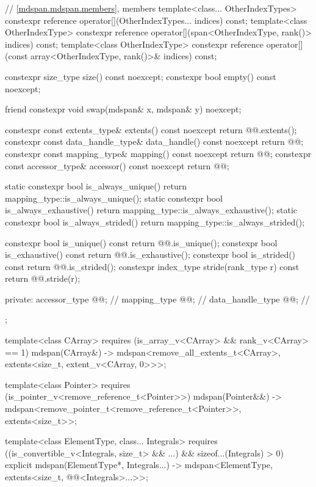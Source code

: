 \begin{codeblock}
{{    // \ref{mdspan.mdspan.members}, members
    template<class... OtherIndexTypes>
      constexpr reference operator[](OtherIndexTypes... indices) const;
    template<class OtherIndexType>
      constexpr reference operator[](span<OtherIndexType, rank()> indices) const;
    template<class OtherIndexType>
      constexpr reference operator[](const array<OtherIndexType, rank()>& indices) const;

    constexpr size_type size() const noexcept;
    constexpr bool empty() const noexcept;

    friend constexpr void swap(mdspan& x, mdspan& y) noexcept;

    constexpr const extents_type& extents() const noexcept { return @@.extents(); }
    constexpr const data_handle_type& data_handle() const noexcept { return @@; }
    constexpr const mapping_type& mapping() const noexcept { return @@; }
    constexpr const accessor_type& accessor() const noexcept { return @@; }

    static constexpr bool is_always_unique()
      { return mapping_type::is_always_unique(); }
    static constexpr bool is_always_exhaustive()
      { return mapping_type::is_always_exhaustive(); }
    static constexpr bool is_always_strided()
      { return mapping_type::is_always_strided(); }

    constexpr bool is_unique() const
      { return @@.is_unique(); }
    constexpr bool is_exhaustive() const
      { return @@.is_exhaustive(); }
    constexpr bool is_strided() const
      { return @@.is_strided(); }
    constexpr index_type stride(rank_type r) const
      { return @@.stride(r); }

  private:
    accessor_type @@;         // \expos
    mapping_type @@;          // \expos
    data_handle_type @@;      // \expos
  };

  template<class CArray>
    requires (is_array_v<CArray> && rank_v<CArray> == 1)
    mdspan(CArray&)
      -> mdspan<remove_all_extents_t<CArray>, extents<size_t, extent_v<CArray, 0>>>;

  template<class Pointer>
    requires (is_pointer_v<remove_reference_t<Pointer>>)
    mdspan(Pointer&&)
      -> mdspan<remove_pointer_t<remove_reference_t<Pointer>>, extents<size_t>>;

  template<class ElementType, class... Integrals>
    requires ((is_convertible_v<Integrals, size_t> && ...) && sizeof...(Integrals) > 0)
    explicit mdspan(ElementType*, Integrals...)
      -> mdspan<ElementType, extents<size_t, @@<Integrals>...>>;

}
\end{codeblock}
